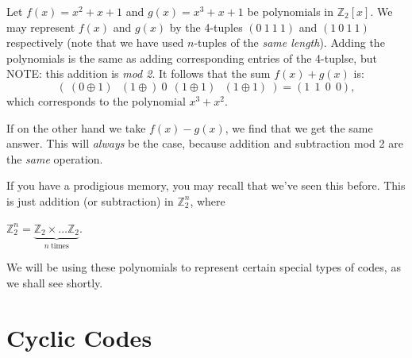 \begin{example}{}
Let $f(x) = x^2 + x + 1$ and $g(x) = x^3   + x + 1$  be polynomials in $\mathbb{Z}_2[x]$.  We may represent $f(x)$ and $g(x)$  by the 4-tuples $(0~1~1~1)$ and $(1~0~1~1)$ respectively (note that we have used $n$-tuples of the \emph{same length}). Adding the polynomials is the same as adding corresponding entries of the 4-tuplse, but NOTE: this addition is \emph{mod 2}. It follows that the sum $f(x)+g(x)$ is:
\[\left( ~(0\oplus 1)~~~(1\oplus )~0~~(1 \oplus 1)~~~(1 \oplus 1)~\right) = (1~~1~~0~~0), \]
which corresponds to the polynomial $x^3   + x^2$. 

If on the other hand we take $f(x) - g(x)$, we find that we get the same answer. This will \emph{always} be the case, because addition and subtraction mod 2 are the \emph{same} operation.

If you have a prodigious memory, you may recall that we've seen this before. This is just addition (or subtraction) in $\mathbb{Z}_2^n$, where

$\mathbb{Z}_2^n = \underbrace{\mathbb{Z}_2 \times \ldots \mathbb{Z}_2}_{n~\text{times}}$.
\end{example}


We will be using these polynomials to represent certain special types of codes, as we shall see shortly.



\section{Cyclic Codes}

